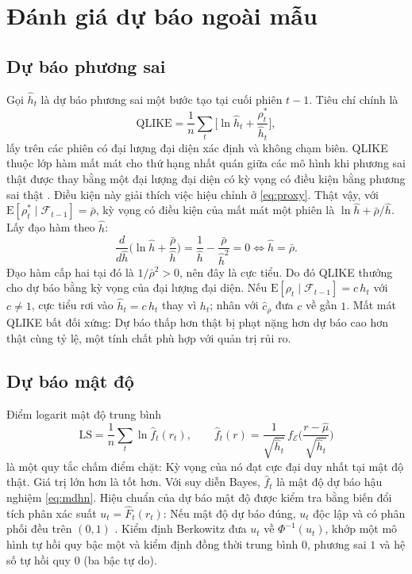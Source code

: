 \documentclass[12pt,a4paper]{article}
\theoremstyle{definition}
\theoremstyle{remark}
\newcommand{\E}{\mathrm{E}}
\newcommand{\QLIKE}{\mathrm{QLIKE}}
\newcommand{\LS}{\mathrm{LS}}
\newcommand{\Fcal}{\mathcal{F}}
\newcommand{\Ecal}{\mathcal{E}}
\begin{document}
\section{Đánh giá dự báo ngoài mẫu}\label{sec:danhgia}

\subsection{Dự báo phương sai}\label{sec:qlike}

Gọi $\hat h_t$ là dự báo phương sai một bước tạo tại cuối phiên $t-1$. Tiêu chí chính là
\begin{equation}
\QLIKE=\frac1n\sum_{t}\Big[\ln\hat h_t+\frac{\rho^{*}_t}{\hat h_t}\Big],
\end{equation}
lấy trên các phiên có đại lượng đại diện xác định và không chạm biên. QLIKE thuộc lớp hàm mất mát cho thứ hạng nhất quán giữa các mô hình khi phương sai thật được thay bằng một đại lượng đại diện có kỳ vọng có điều kiện bằng phương sai thật \cite{patton2011}. Điều kiện này giải thích việc hiệu chỉnh ở \eqref{eq:proxy}. Thật vậy, với $\E[\rho^{*}_t\mid\Fcal_{t-1}]=\bar\rho$, kỳ vọng có điều kiện của mất mát một phiên là $\ln\hat h+\bar\rho/\hat h$. Lấy đạo hàm theo $\hat h$:
\begin{equation*}
\frac{d}{d\hat h}\Big(\ln\hat h+\frac{\bar\rho}{\hat h}\Big)=\frac1{\hat h}-\frac{\bar\rho}{\hat h^{2}}=0\iff\hat h=\bar\rho .
\end{equation*}
Đạo hàm cấp hai tại đó là $1/\bar\rho^{2}>0$, nên đây là cực tiểu. Do đó QLIKE thưởng cho dự báo bằng kỳ vọng của đại lượng đại diện. Nếu $\E[\rho_t\mid\Fcal_{t-1}]=c\,h_t$ với $c\neq1$, cực tiểu rơi vào $\hat h_t=c\,h_t$ thay vì $h_t$; nhân với $\hat c_\rho$ đưa $c$ về gần $1$. Mất mát QLIKE bất đối xứng: Dự báo thấp hơn thật bị phạt nặng hơn dự báo cao hơn thật cùng tỷ lệ, một tính chất phù hợp với quản trị rủi ro.

\subsection{Dự báo mật độ}

Điểm logarit mật độ trung bình
\begin{equation}
\LS=\frac1n\sum_t\ln\hat f_t(r_t),\qquad
\hat f_t(r)=\frac{1}{\sqrt{\hat h_t}}\,f_\Ecal\Big(\frac{r-\hat\mu}{\sqrt{\hat h_t}}\Big)
\end{equation}
là một quy tắc chấm điểm chặt: Kỳ vọng của nó đạt cực đại duy nhất tại mật độ thật. Giá trị lớn hơn là tốt hơn. Với suy diễn Bayes, $\hat f_t$ là mật độ dự báo hậu nghiệm \eqref{eq:mdhn}. Hiệu chuẩn của dự báo mật độ được kiểm tra bằng biến đổi tích phân xác suất $u_t=\hat F_t(r_t)$: Nếu mật độ dự báo đúng, $u_t$ độc lập và có phân phối đều trên $(0,1)$ \cite{dgt1998}. Kiểm định Berkowitz \cite{berkowitz2001} đưa $u_t$ về $\Phi^{-1}(u_t)$, khớp một mô hình tự hồi quy bậc một và kiểm định đồng thời trung bình $0$, phương sai $1$ và hệ số tự hồi quy $0$ (ba bậc tự do).
\end{document}
